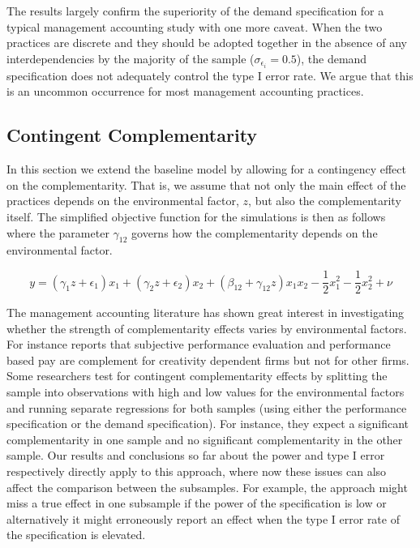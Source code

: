 \documentclass[12pt]{article}
\begin{document}
The results largely confirm the superiority of the demand specification for a typical management accounting study with one more caveat. When the two practices are discrete and they should be adopted together in the absence of any interdependencies by the majority of the sample ($\sigma_{\epsilon_i} = 0.5$), the demand specification does not adequately control the type I error rate. We argue that this is an uncommon occurrence for most management accounting practices.



\subsection{Contingent Complementarity}

In this section we extend the baseline model by allowing for a contingency effect on the complementarity. That is, we assume that not only the main effect of the practices depends on the environmental factor, $z$, but also the complementarity itself. The simplified objective function for the simulations is then as follows where the parameter $\gamma_{12}$ governs how the complementarity depends on the environmental factor. 

\begin{equation}
\label{eq:contingent-complement}
y = (\gamma_1 z + \epsilon_1) x_1 + (\gamma_2 z + \epsilon_2) x_2 + 
    (\beta_{12} + \gamma_{12} z) x_1 x_2 - \frac{1}{2} x^2_1 - \frac{1}{2} x^2_2 + \nu
\end{equation}

The management accounting literature has shown great interest in investigating whether the strength of complementarity effects varies by environmental factors. For instance \citet{grabner_incentive_2014} reports that subjective performance evaluation and performance based pay are complement for creativity dependent firms but not for other firms. Some researchers test for contingent complementarity effects by splitting the sample into observations with high and low values for the environmental factors and running separate regressions for both samples (using either the performance specification or the demand specification). For instance, they expect a significant complementarity in one sample and no significant complementarity in the other sample. Our results and conclusions so far about the power and type I error respectively directly apply to this approach, where now these issues can also affect the comparison between the subsamples. For example, the approach might miss a true effect in one subsample if the power of the specification is low or alternatively it might erroneously report an effect when the type I error rate of the specification is elevated. 
\end{document}
